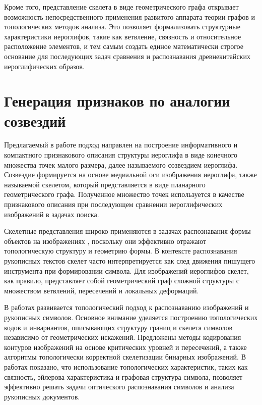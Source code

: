 Кроме того, представление скелета в виде геометрического графа открывает возможность непосредственного применения развитого аппарата теории графов и топологических методов анализа. Это позволяет формализовать структурные характеристики иероглифов, такие как ветвление, связность и относительное расположение элементов, и тем самым создать единое математически строгое основание для последующих задач сравнения и распознавания древнекитайских иероглифических образов.

\section{Генерация признаков по аналогии созвездий}\label{sec:ch3/sec1}

Предлагаемый в работе подход направлен на построение информативного и компактного признакового описания структуры иероглифа в виде конечного множества точек малого размера, далее называемого созвездием иероглифа. Созвездие формируется на основе медиальной оси изображения иероглифа, также называемой скелетом, который представляется в виде планарного геометрического графа. Полученное множество точек используется в качестве признакового описания при последующем сравнении иероглифических изображений в задачах поиска.

Скелетные представления широко применяются в задачах распознавания формы объектов на изображениях \cite{siddiqi2008medial}, поскольку они эффективно отражают топологическую структуру и геометрию формы. В контексте распознавания рукописных текстов скелет часто интерпретируется как след движения пишущего инструмента при формировании символа. Для изображений иероглифов скелет, как правило, представляет собой геометрический граф сложной структуры с множеством ветвлений, пересечений и локальных деформаций.

В работах \cite{shchepin2013crossing, shchepinтороlogical, shchepin2012topological} развивается топологический подход к распознаванию изображений и рукописных символов. Основное внимание уделяется построению топологических кодов и инвариантов, описывающих структуру границ и скелета символов независимо от геометрических искажений. Предложены методы кодирования контуров изображений на основе критических уровней и пересечений, а также алгоритмы топологически корректной скелетизации бинарных изображений. В работах показано, что использование топологических характеристик, таких как связность, эйлерова характеристика и графовая структура символа, позволяет эффективно решать задачи оптического распознавания символов и анализа рукописных документов.

